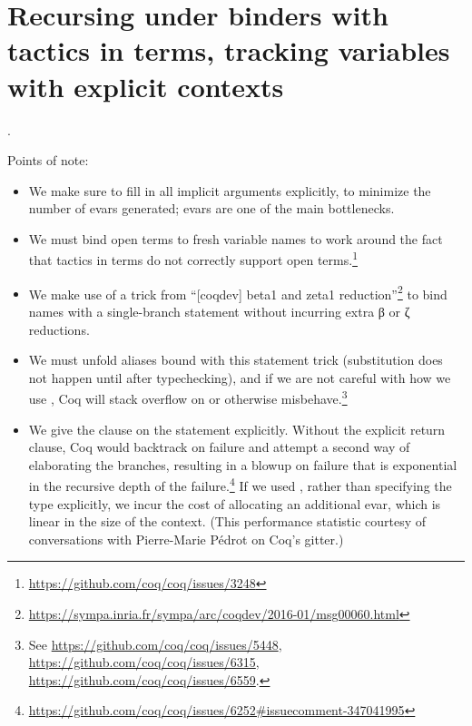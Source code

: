 \begin{coqdoccode}
\end{coqdoccode}
\section{Recursing under binders with tactics in terms, tracking variables with explicit contexts}

\begin{coqdoccode}
\coqdocnoindent
{}  .\coqdoceol
\coqdocemptyline
\end{coqdoccode}
Points of note:



\begin{itemize}
\item  We make sure to fill in all implicit arguments explicitly, to
      minimize the number of evars generated; evars are one of the
      main bottlenecks.



\item  We must bind open terms to fresh variable names to work around
      the fact that tactics in terms do not correctly support open
      terms.\footnote{\url{https://github.com/coq/coq/issues/3248}}



\item  We make use of a trick from ``[coqdev] beta1 and zeta1
      reduction''\footnote{\url{https://sympa.inria.fr/sympa/arc/coqdev/2016-01/msg00060.html}}
      to bind names with a single-branch  statement without
      incurring extra β or ζ reductions.



\item  We must unfold aliases bound with this  statement trick
      (substitution does not happen until after typechecking), and if
      we are not careful with how we use , Coq will stack
      overflow on   or otherwise misbehave.\footnote{See
      \url{https://github.com/coq/coq/issues/5448},
      \url{https://github.com/coq/coq/issues/6315},
      \url{https://github.com/coq/coq/issues/6559}.}



\item  We give the  clause on the  statement explicitly.
      Without the explicit return clause, Coq would backtrack on
      failure and attempt a second way of elaborating the 
      branches, resulting in a blowup on failure that is exponential
      in the recursive depth of the
      failure.\footnote{\url{https://github.com/coq/coq/issues/6252\#issuecomment-347041995}}
      If we used  \coqdocvar{\_}, rather than specifying the type
      explicitly, we incur the cost of allocating an additional evar,
      which is linear in the size of the context.  (This performance
      statistic courtesy of conversations with Pierre-Marie Pédrot on
      Coq's gitter.)




\end{itemize}
